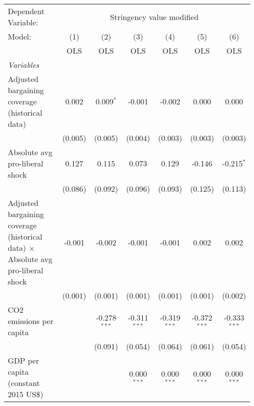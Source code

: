 
\begingroup
\centering
\begin{tabular}{lcccccc}
   \toprule
   Dependent Variable: & \multicolumn{6}{c}{Stringency value modified}\\
   Model:                                                                                  & (1)     & (2)            & (3)            & (4)            & (5)            & (6)\\  
                                                                                           &  OLS    & OLS            & OLS            & OLS            & OLS            & OLS\\  
   \midrule
   \emph{Variables}\\
   Adjusted bargaining coverage (historical data)                                          & 0.002   & 0.009$^{*}$    & -0.001         & -0.002         & 0.000          & 0.000\\   
                                                                                           & (0.005) & (0.005)        & (0.004)        & (0.003)        & (0.003)        & (0.003)\\   
   Absolute avg pro-liberal shock                                                          & 0.127   & 0.115          & 0.073          & 0.129          & -0.146         & -0.215$^{*}$\\   
                                                                                           & (0.086) & (0.092)        & (0.096)        & (0.093)        & (0.125)        & (0.113)\\   
   Adjusted bargaining coverage (historical data) $\times$ Absolute avg pro-liberal shock  & -0.001  & -0.002         & -0.001         & -0.001         & 0.002          & 0.002\\   
                                                                                           & (0.001) & (0.001)        & (0.001)        & (0.001)        & (0.001)        & (0.002)\\   
   CO2 emissions per capita                                                                &         & -0.278$^{***}$ & -0.311$^{***}$ & -0.319$^{***}$ & -0.372$^{***}$ & -0.333$^{***}$\\   
                                                                                           &         & (0.091)        & (0.054)        & (0.064)        & (0.061)        & (0.054)\\   
   GDP per capita (constant 2015 US\$)                                                     &         &                & 0.000$^{***}$  & 0.000$^{***}$  & 0.000$^{***}$  & 0.000$^{***}$\\   

\end{tabular}
